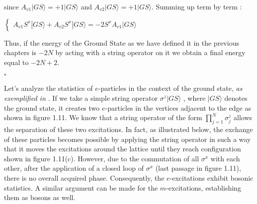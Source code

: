 since $A_{v1}|GS\rangle = +1|GS\rangle$ and $A_{v2}|GS\rangle = +1|GS\rangle$.
Summing up term by term :

\begin{center}
	$\begin{cases}
		A_{v1} S^x |GS\rangle + A_{v2} S^x |GS\rangle = - 2 S^x A_{v1} |GS\rangle
	\end{cases}$ 
\end{center}

Thus, if the energy of the Ground State as we have defined it in the previous chapters is $-2N$ by acting with a string operator on  it we obtain a final energy equal to $-2N+2$.

\hfill $\square$ \newline


\newpage
Let's analyze the statistics of $e$-particles in the context of the ground state, \textit{as exemplified in \cite{Rao16}}. If we take a simple string operator $\sigma^z|GS\rangle$ , where $|GS\rangle$ denotes the ground state, it creates two $e$-particles in the vertices adjacent to the edge as shown in figure 1.11. \newline 
We know that a string operator of the form $\prod_{j=1}^{N} \sigma_j^z$ allows the separation of these two excitations. In fact, as illustrated below, the exchange of these particles becomes possible by applying the string operator in such a way that it moves the excitations around the lattice until they reach configuration shown in figure 1.11(c). 
However, due to the commutation of all $\sigma^x$ with each other, after the application of a closed loop of $\sigma^x$ (last passage in figure 1.11), there is no overall acquired phase. Consequently, the $e$-excitations exhibit bosonic statistics. A similar argument can be made for the $m$-excitations, establishing them as bosons as well.\newline

